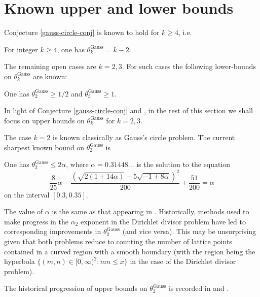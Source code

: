 \section{Known upper and lower bounds}

Conjecture \ref{gauss-circle-conj} is known to hold for $k \ge 4$, i.e.

\begin{theorem}
For integer $k \ge 4$, one has $\theta^{\operatorname{Gauss}}_{k} = k - 2$.
\end{theorem}

The remaining open cases are $k = 2, 3$. For such cases the following lower-bounds on $\theta^{\operatorname{Gauss}}_{k}$ are known:

\begin{theorem}\label{gauss-circle-lower-23}
One has $\theta^{\operatorname{Gauss}}_{2} \ge 1/2$ and $\theta^{\operatorname{Gauss}}_{3} \ge 1$.
\end{theorem}

In light of Conjecture \ref{gauss-circle-conj} and , in the rest of this section we shall focus on upper bounds on $\theta^{\operatorname{Gauss}}_{k}$ for $k = 2, 3$.

The case $k = 2$ is known classically as Gauss's circle problem. The current sharpest known bound on $\theta_2^{\operatorname{Gauss}}$ is
\begin{theorem}
One has $\theta_2^{\operatorname{Gauss}} \le 2\alpha$, where $\alpha = 0.31448\ldots$ is the solution to the equation
\[
\frac{8}{25}\alpha - \frac{(\sqrt{2(1+14\alpha)} - 5\sqrt{-1+8\alpha})^2}{200} + \frac{51}{200} = \alpha
\]
on the interval $[0.3, 0.35]$.
\end{theorem}

\begin{remark}
The value of $\alpha$ is the same as that appearing in . Historically, methods used to make progress in the $\alpha_2$ exponent in the Dirichlet divisor problem have led to corresponding improvements in $\theta_2^{\operatorname{Gauss}}$ (and vice versa). This may be unsurprising given that both problems reduce to counting the number of lattice points contained in a curved region with a smooth boundary (with the region being the hyperbola $\{(m,n) \in [0, \infty)^2: mn \le x \}$ in the case of the Dirichlet divisor problem).
\end{remark}

The historical progression of upper bounds on $\theta_2^{\operatorname{Gauss}}$ is recorded in  and .


